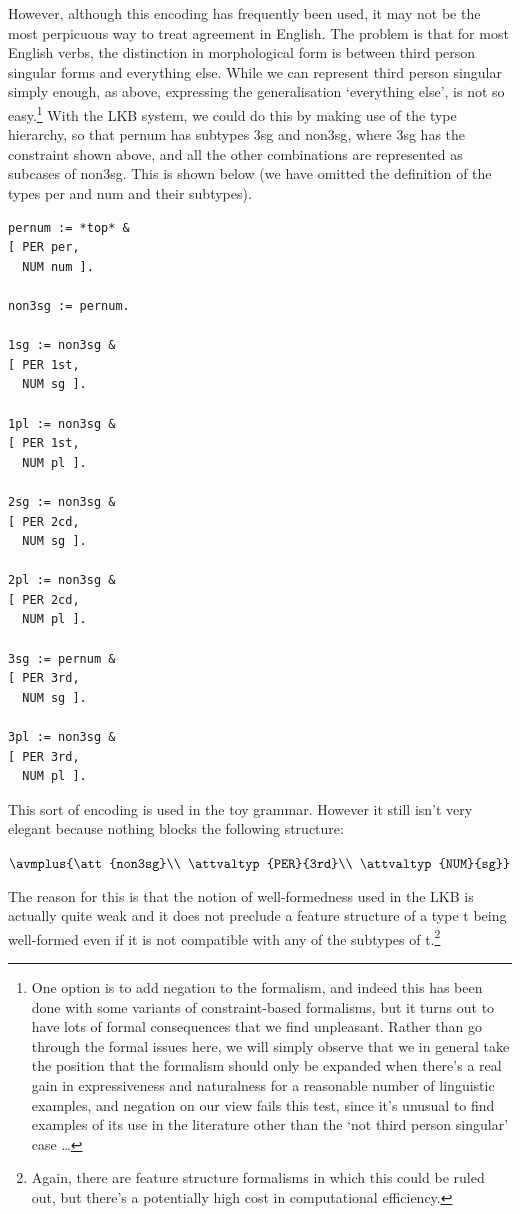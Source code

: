 \documentclass[12pt]{report}
\begin{document}
However, although this encoding has frequently been used, it may not be the
most perpicuous way to treat agreement in English.  The problem is that
for most English verbs, the distinction in morphological form is between
third person singular forms and everything else.  While we can represent
third person singular simply enough, as above, expressing the generalisation
`everything else', is not so easy.\footnote{One option
is to add negation to the formalism, and indeed this has been done with some
variants of constraint-based formalisms, but it turns out to have lots
of formal consequences that we find unpleasant.  Rather than go through
the formal issues here, we will simply observe that we in general take the 
position that the formalism should only be expanded when there's a real
gain in expressiveness and naturalness for a reasonable
number of linguistic examples, and negation
on our view fails this test, since it's unusual to find examples of its use in
the literature other than the `not third person singular' case \ldots}
With the LKB system, we could do
this by making use of the type hierarchy, so that {\type pernum}
has subtypes {\type 3sg} and {\type non3sg}, 
where {\type 3sg} has the constraint shown above, and all the other
combinations are represented as subcases of {\type non3sg}.  This is shown below
(we have omitted the definition of the types {\type per} and {\type num} and their
subtypes).
\begin{verbatim}
pernum := *top* &
[ PER per, 
  NUM num ].

non3sg := pernum.

1sg := non3sg &
[ PER 1st, 
  NUM sg ].

1pl := non3sg &
[ PER 1st, 
  NUM pl ].

2sg := non3sg &
[ PER 2cd, 
  NUM sg ].

2pl := non3sg &
[ PER 2cd, 
  NUM pl ].

3sg := pernum &
[ PER 3rd, 
  NUM sg ].

3pl := non3sg &
[ PER 3rd, 
  NUM pl ].

\end{verbatim}

This sort of encoding is used in the toy grammar.
However it still isn't very elegant because
nothing blocks the 
following structure:
\begin{ex}
{\tiny $\avmplus{\att{non3sg}\\ \attvaltyp{PER}{3rd}\\  \attvaltyp{NUM}{sg}}$}
\end{ex}
The reason for this is that the notion of well-formedness used in the
LKB is actually quite weak and it does not preclude a feature structure
of a type {\type t}
being well-formed even if it is not compatible with any of the subtypes
of {\type t}.\footnote{Again, there are feature structure formalisms in which
this could be ruled out, but there's a potentially high cost in computational
efficiency.}
\end{document}
